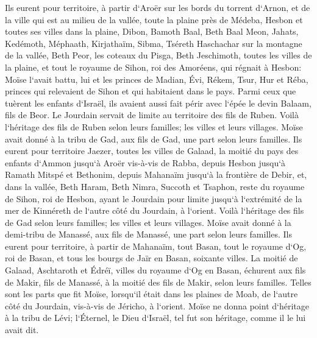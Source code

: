 \verse Ils eurent pour territoire, à partir d`Aroër sur les bords du torrent d`Arnon, et de la ville qui est au milieu de la vallée, toute la plaine près de Médeba, 
\verse Hesbon et toutes ses villes dans la plaine, Dibon, Bamoth Baal, Beth Baal Meon, 
\verse Jahats, Kedémoth, Méphaath, 
\verse Kirjathaïm, Sibma, Tséreth Haschachar sur la montagne de la vallée, 
\verse Beth Peor, les coteaux du Pisga, Beth Jeschimoth, 
\verse toutes les villes de la plaine, et tout le royaume de Sihon, roi des Amoréens, qui régnait à Hesbon: Moïse l`avait battu, lui et les princes de Madian, Évi, Rékem, Tsur, Hur et Réba, princes qui relevaient de Sihon et qui habitaient dans le pays. 
\verse Parmi ceux que tuèrent les enfants d`Israël, ils avaient aussi fait périr avec l`épée le devin Balaam, fils de Beor. 
\verse Le Jourdain servait de limite au territoire des fils de Ruben. Voilà l`héritage des fils de Ruben selon leurs familles; les villes et leurs villages. 
\verse Moïse avait donné à la tribu de Gad, aux fils de Gad, une part selon leurs familles. 
\verse Ils eurent pour territoire Jaezer, toutes les villes de Galaad, la moitié du pays des enfants d`Ammon jusqu`à Aroër vis-à-vis de Rabba, 
\verse depuis Hesbon jusqu`à Ramath Mitspé et Bethonim, depuis Mahanaïm jusqu`à la frontière de Debir, 
\verse et, dans la vallée, Beth Haram, Beth Nimra, Succoth et Tsaphon, reste du royaume de Sihon, roi de Hesbon, ayant le Jourdain pour limite jusqu`à l`extrémité de la mer de Kinnéreth de l`autre côté du Jourdain, à l`orient. 
\verse Voilà l`héritage des fils de Gad selon leurs familles; les villes et leurs villages. 
\verse Moïse avait donné à la demi-tribu de Manassé, aux fils de Manassé, une part selon leurs familles. 
\verse Ils eurent pour territoire, à partir de Mahanaïm, tout Basan, tout le royaume d`Og, roi de Basan, et tous les bourgs de Jaïr en Basan, soixante villes. 
\verse La moitié de Galaad, Aschtaroth et Édréï, villes du royaume d`Og en Basan, échurent aux fils de Makir, fils de Manassé, à la moitié des fils de Makir, selon leurs familles. 
\verse Telles sont les parts que fit Moïse, lorsqu`il était dans les plaines de Moab, de l`autre côté du Jourdain, vis-à-vis de Jéricho, à l`orient. 
\verse Moïse ne donna point d`héritage à la tribu de Lévi; l`Éternel, le Dieu d`Israël, tel fut son héritage, comme il le lui avait dit. 

\chapter{}

